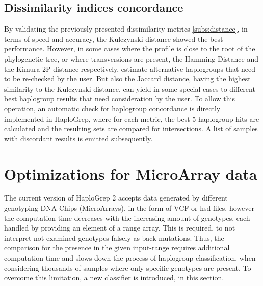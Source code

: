 \subsection{Dissimilarity indices concordance }
By validating the previously presented dissimilarity metrics \ref{subs:distance}, in terms of speed and accuracy, the Kulczynski distance showed the best performance. However, in some cases where the profile is close to the root of the phylogenetic tree, or where transversions are present, the Hamming Distance and the Kimura-2P distance respectively, estimate alternative haplogroups that need to be re-checked by the user. But also the Jaccard distance, having the highest similarity to the Kulczynski distance, can yield in some special cases to different best haplogroup results that need consideration by the user. To allow this operation, an automatic check for haplogroup concordance is directly implemented in HaploGrep, where for each metric, the best 5 haplogroup hits are calculated and the resulting sets are compared for intersections. A list of samples with discordant results is emitted subsequently. 

\section{Optimizations for MicroArray data}\label{hg:outlook}
The current version of HaploGrep 2 accepts data generated by different genotyping DNA Chips (MicroArrays), in the form of VCF or hsd files, however the computation-time decreases with the increasing amount of genotypes, each handled by providing an element of a range array. This is required, to not interpret not examined genotypes falsely as back-mutations. Thus, the comparison for the presence in the given input-range requires additional computation time and slows down the process of haplogroup classification, when considering thousands of samples where only specific genotypes are present. To overcome this limitation, a new classifier is introduced, in this section. 
